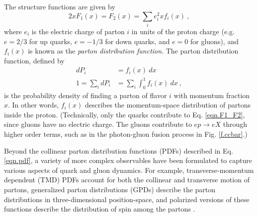 The structure functions are given by \cite{Halzen_Martin}
\begin{equation}
    2xF_1(x) = F_2(x) = \sum_i e_i^2xf_i(x) \ ,
    \label{eqn.F1_F2}
\end{equation}
where $e_i$ is the electric charge of parton $i$ in units of the proton charge (e.g. $e=2/3$ for up quarks, $e=-1/3$ for down quarks, and $e=0$ for gluons), and $f_i(x)$ is known as the {\it parton distribution function}. The parton distribution function, defined by
\begin{equation}
\begin{aligned}
    dP_i &= f_i(x) \ dx \\
    1 = \sum_idP_i &= \sum_i \int_0^1 f_i(x) \ dx \ ,
    \label{eqn.pdf}
\end{aligned}
\end{equation}
is the probability density of finding a parton of flavor $i$ with momentum fraction $x$. In other words, $f_i(x)$ describes the momentum-space distribution of partons inside the proton. (Technically, only the quarks contribute to Eq. \eqref{eqn.F1_F2}, since gluons have no electric charge. The gluons contribute to $ep\rightarrow eX$ through higher order terms, such as in the photon-gluon fusion process in Fig. \ref{f.ccbar}.)

Beyond the collinear parton distribution functions (PDFs) described in Eq. \eqref{eqn.pdf}, a variety of more complex observables have been formulated to capture various aspects of quark and gluon dynamics. For example, transverse-momentum dependent (TMD) PDFs account for both the collinear and transverse motion of partons, generalized parton distributions (GPDs) describe the parton distributions in three-dimensional position-space, and polarized versions of these functions describe the distribution of spin among the partons \cite{pdfs}.



